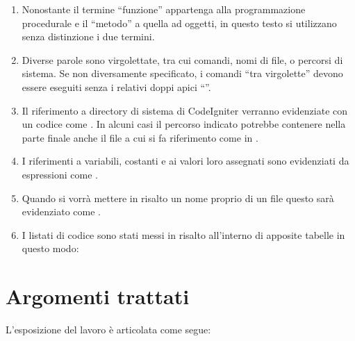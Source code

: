 \begin{enumerate}
\item Nonostante il termine ``funzione'' appartenga alla programmazione procedurale e il ``metodo'' a quella ad oggetti, in questo testo si utilizzano senza distinzione i due termini.
\item Diverse parole sono virgolettate, tra cui comandi, nomi di file, o percorsi di sistema. Se non diversamente specificato, i comandi ``tra virgolette'' devono essere eseguiti senza i relativi doppi apici ``''.
\item Il riferimento a directory di sistema di CodeIgniter verranno evidenziate con un codice come . In alcuni casi il percorso indicato potrebbe contenere nella parte finale anche il file a cui si fa riferimento come in .
\item I riferimenti a variabili, costanti e ai valori loro assegnati sono evidenziati da espressioni come .
\item Quando si vorrà mettere in risalto un nome proprio di un file questo sarà evidenziato come .
\item I listati di codice sono stati messi in risalto all'interno di apposite tabelle in questo modo:

\end{enumerate}

\section*{Argomenti trattati}
L'esposizione del lavoro è articolata come segue:

